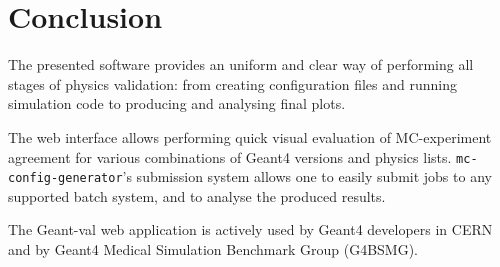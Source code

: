 \section{Conclusion}
\label{sec-status}

The presented software provides an uniform and clear way of performing all stages of physics validation: from creating configuration files and running simulation code to producing and analysing final plots.

The web interface allows performing quick visual evaluation of MC-experiment agreement for various combinations of Geant4 versions and physics lists. %
\texttt{mc-config-generator}'s submission system allows one to easily submit jobs to any supported batch system, and to analyse the produced results.%

The \textsf{Geant-val} web application
is actively used by Geant4 developers in CERN and by Geant4 Medical Simulation Benchmark Group (G4BSMG).





